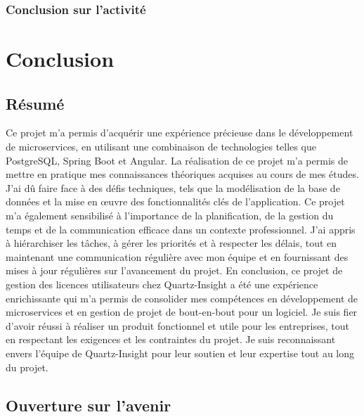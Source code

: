 \documentclass[a4paper, 11pt]{report}
\begin{document}
\subsection{Conclusion sur l'activité}

\chapter{Conclusion}

\section{Résumé}
Ce projet m'a permis d'acquérir une expérience précieuse dans le dévelop\-pement de microservices, en utilisant une combinaison de technologies telles que PostgreSQL, Spring Boot et Angular.
La réalisation de ce projet m'a permis de mettre en pratique mes connaissances théoriques acquises au cours de mes études.
J'ai dû faire face à des défis techniques, tels que la modélisation de la base de données et la mise en œuvre des fonctionnalités clés de l'application.
Ce projet m'a également sensibilisé à l'importance de la planification, de la gestion du temps et de la communication efficace dans un contexte professionnel.
J'ai appris à hiérarchiser les tâches, à gérer les priorités et à respecter les délais, tout en maintenant une communication régulière avec mon équipe et en fournissant des mises à jour régulières sur l'avancement du projet.
\newline
\newline
En conclusion, ce projet de gestion des licences utilisateurs chez Quartz-Insight a été une expérience enrichissante qui m'a permis de consolider mes compétences en développement de microservices et en gestion de projet de bout-en-bout pour un logiciel.
Je suis fier d'avoir réussi à réaliser un produit fonctionnel et utile pour les entreprises, tout en respectant les exigences et les contraintes du projet.
Je suis reconnaissant envers l'équipe de Quartz-Insight pour leur soutien et leur expertise tout au long du projet.
\section{Ouverture sur l'avenir}
\end{document}
